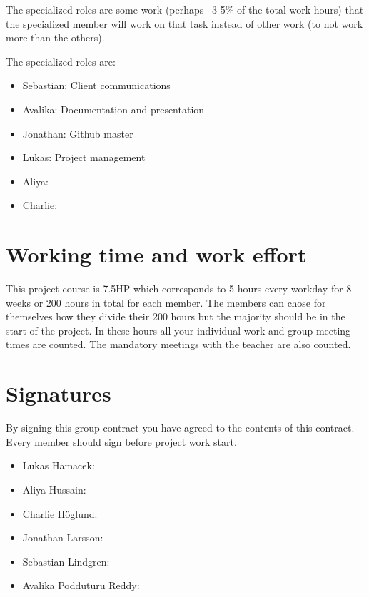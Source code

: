 \documentclass[]{article}
\begin{document}
The specialized roles are some work (perhaps ~3-5\% of the total work hours) that the specialized member will work on that task instead of other work (to not work more than the others).

The specialized roles are:
\begin{itemize}
	\item Sebastian: Client communications
	\item Avalika: Documentation and presentation
	\item Jonathan: Github master
	\item Lukas: Project management 
	\item Aliya: 
	\item Charlie: 
\end{itemize}

\section{Working time and work effort}
This project course is 7.5HP which corresponds to 5 hours every workday for 8 weeks or 200 hours in total for each member. The members can chose for themselves how they divide their 200 hours but the majority should be in the start of the project. In these hours all your individual work and group meeting times are counted. The mandatory meetings with the teacher are also counted. 

\section{Signatures}
By signing this group contract you have agreed to the contents of this contract. Every member should sign before project work start.

\begin{itemize}
	\item Lukas Hamacek: \hspace{1.5cm} \makebox[2.5in]{\hrulefill}
	\item Aliya Hussain: \hspace{1.80cm} \makebox[2.5in]{\hrulefill}
	\item Charlie Höglund: \hspace{1.60cm} \makebox[2.5in]{\hrulefill}
	\item Jonathan Larsson: \hspace{1.25cm} \makebox[2.5in]{\hrulefill}
	\item Sebastian Lindgren: \hspace{1.05cm} \makebox[2.5in]{\hrulefill}
	\item Avalika Podduturu Reddy: \hspace{0.0cm} \makebox[2.5in]{\hrulefill}
\end{itemize}
\end{document}
